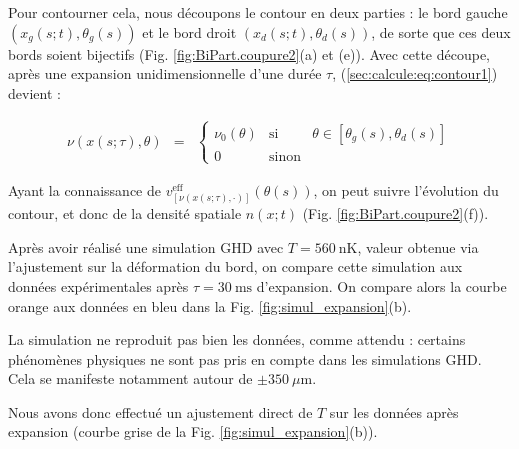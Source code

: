 Pour contourner cela, nous découpons le contour en deux parties : le bord gauche $(x_g(s; t), \theta_g(s))$ et le bord droit $(x_d(s; t), \theta_d(s))$, de sorte que ces deux bords soient bijectifs (Fig. \ref{fig:BiPart.coupure2}(a) et (e)). Avec cette découpe, après une expansion unidimensionnelle d’une durée $\tau$, (\ref{sec:calcule:eq:contour1}) devient :

\begin{eqnarray*}
	\label{sec:calcule:eq:contour.exp}
	\nu ( x(s;\tau), \theta ) & = & 
	\left\{ 
	\begin{array}{rcl}
	\nu_0(\theta) & \mbox{si} & \theta \in [\theta_g(s), \theta_d(s)] \\
	0 & \mbox{sinon} & 
	\end{array} 
	\right.
\end{eqnarray*}

Ayant la connaissance de $v^{\mathrm{eff}}_{[\nu(x(s;\tau),\cdot)]}(\theta(s))$, on peut suivre l’évolution du contour, et donc de la densité spatiale $n(x;t)$ (Fig. \ref{fig:BiPart.coupure2}(f)). 

Après avoir réalisé une simulation GHD avec $T = 560~\mathrm{nK}$, valeur obtenue via l’ajustement sur la déformation du bord, on compare cette simulation aux données expérimentales après $\tau = 30~\mathrm{ms}$ d’expansion. On compare alors la courbe orange aux données en bleu dans la Fig. \ref{fig:simul_expansion}(b). 

La simulation ne reproduit pas bien les données, comme attendu : certains phénomènes physiques ne sont pas pris en compte dans les simulations GHD. Cela se manifeste notamment autour de $\pm 350~\mu\mathrm{m}$. 

Nous avons donc effectué un ajustement direct de $T$ sur les données après expansion (courbe grise de la Fig. \ref{fig:simul_expansion}(b)).

